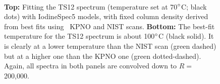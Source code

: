 \begin{figure}
\centering
{}\
\caption{{\bf Top:} Fitting the TS12 spectrum (temperature set at
70$^{\circ}$C; black dots) with IodineSpec5 models, with fixed column
density derived from best fits using \het\ KPNO and NIST scans. {\bf
Bottom:} The best-fit temperature for the TS12 spectrum is about
100$^{\circ}$C (black solid). It is clearly at a lower temperature than
the NIST scan (green dashed) but at a higher one than the KPNO one
(green dotted-dashed). Again, all spectra in both panels are convolved
down to $R=$ 200,000.
\label{het:fig:ts12fit}}
\end{figure}

